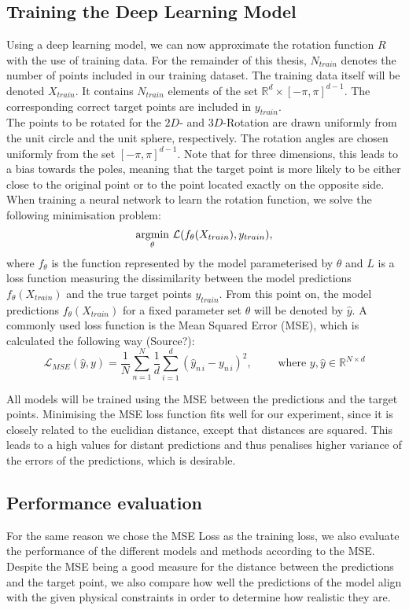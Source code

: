 \subsection{Training the Deep Learning Model}
\indent Using a deep learning model, we can now approximate the rotation function $R$ with the use of training data. For the remainder of this thesis, $N_{train}$ denotes the number of points included in our training dataset. The training data itself will be denoted $X_{train}$. It contains $N_{train}$ elements of the set $\mathbb{R}^{d} \times [- \pi, \pi] ^{d-1}$. The corresponding correct target points are included in $y_{train}$.\\
\indent The points to be rotated for the $2D$- and $3D$-Rotation are drawn uniformly from the unit circle and the unit sphere, respectively. The rotation angles are chosen uniformly from the set $[-\pi, \pi]^{d-1}$. Note that for three dimensions, this leads to a bias towards the poles, meaning that the target point is more likely to be either close to the original point or to the point located exactly on the opposite side.\\
\indent When training a neural network to learn the rotation function, we solve the following minimisation problem:
\[\underset{\theta}{\operatorname*{argmin}} \,\, \mathcal{L}(f_{\theta} (X_{train}), y_{train}), \]
where $f_\theta$ is the function represented by the model parameterised by $\theta$ and $L$ is a loss function measuring the dissimilarity between the model predictions $f_{\theta} (X_{train})$ and the true target points $y_{train}$. From this point on, the model predictions $f_{\theta} (X_{train})$ for a fixed parameter set $\theta$ will be denoted by $\hat{y}$.
A commonly used loss function is the Mean Squared Error (MSE), which is calculated the following way (Source?):
\[\mathcal{L}_{MSE}(\hat{y}, y) = \frac{1}{N}\sum_{n = 1}^{N} \frac{1}{d} \sum_{i = 1}^{d} (\hat{y}_{n\,i} - y_{n\,i})^2, \qquad \text{ where } y, \hat{y} \in \mathbb{R}^{N \times d}\]

\indent All models will be trained using the MSE between the predictions and the target points. Minimising the MSE loss function fits well for our experiment, since it is closely related to the euclidian distance, except that distances are squared. This leads to a high values for distant predictions and thus penalises higher variance of the errors of the predictions, which is desirable.\\ 

\subsection{Performance evaluation}
For the same reason we chose the MSE Loss as the training loss, we also evaluate the performance of the different models and methods according to the MSE. Despite the MSE being a good measure for the distance between the predictions and the target point, we also compare how well the predictions of the model align with the given physical constraints in order to determine how realistic they are.\\

